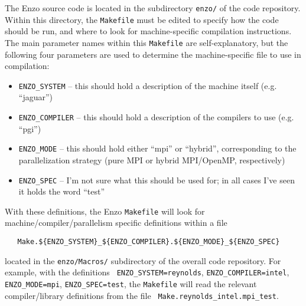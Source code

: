 \documentclass[letterpaper,10pt]{article}
\renewcommand{\(}{\left(}
\renewcommand{\)}{\right)}
\begin{document}
The Enzo source code is located in the subdirectory {\tt enzo/} of the
code repository.  Within this directory, the {\tt Makefile} must be
edited to specify how the code should be run, and where to look for
machine-specific compilation instructions.  The main parameter
names within this {\tt Makefile} are self-explanatory, but the
following four parameters are used to determine the machine-specific
file to use in compilation:
\begin{itemize}
\item {\tt ENZO\_SYSTEM} -- this should hold a description of the
  machine itself (e.g. ``jaguar'')
\item {\tt ENZO\_COMPILER} -- this should hold a description of the
  compilers to use (e.g. ``pgi'')
\item {\tt ENZO\_MODE} -- this should hold either ``mpi'' or
  ``hybrid'', corresponding to the parallelization strategy (pure MPI
  or hybrid MPI/OpenMP, respectively)
\item {\tt ENZO\_SPEC} -- I'm not sure what this should be used for;
  in all cases I've seen it holds the word ``test''
\end{itemize}
With these definitions, the Enzo {\tt Makefile} will look for
machine/compiler/parallelism specific definitions within a file
\begin{verbatim}
   Make.${ENZO_SYSTEM}_${ENZO_COMPILER}.${ENZO_MODE}_${ENZO_SPEC}
\end{verbatim}
located in the {\tt enzo/Macros/} subdirectory of the overall code
repository.  For example, with the definitions {\tt
ENZO\_SYSTEM=reynolds}, {\tt ENZO\_COMPILER=intel}, {\tt
ENZO\_MODE=mpi}, {\tt ENZO\_SPEC=test}, the {\tt Makefile} will read
the relevant compiler/library definitions from the file {\tt
Make.reynolds\_intel.mpi\_test}. 
\end{document}
